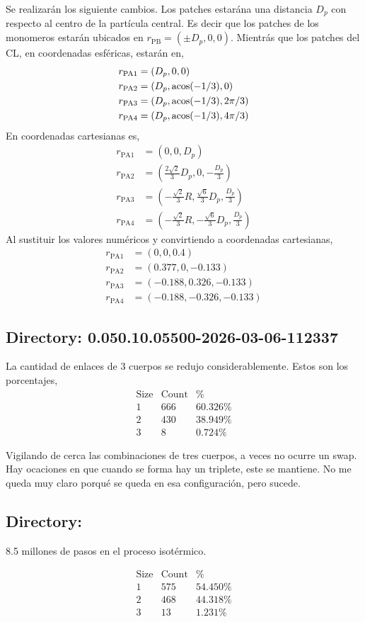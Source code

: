 \documentclass[../main.tex]{subfiles}
\begin{document}
Se realizarán los siguiente cambios.
Los patches estarána una distancia \(D_p\) con respecto al centro de la partícula central.
Es decir que los patches de los monomeros estarán ubicados en \(r_{\mathrm{PB}} = (\pm D_p, 0, 0)\).
Mientrás que los patches del CL, en coordenadas esféricas, estarán en,
\begin{align*}
    r_{\mathrm{PA}1} &= (D_p,0,0) \\
    r_{\mathrm{PA}2} &= (D_p,\acos(-1/3),0) \\
    r_{\mathrm{PA}3} &= (D_p,\acos(-1/3),2\pi/3) \\
    r_{\mathrm{PA}4} &= (D_p,\acos(-1/3),4\pi/3)
\end{align*}
En coordenadas cartesianas es,
\begin{align*}
    r_{\mathrm{PA}1} &= (0,0,D_p) \\
    r_{\mathrm{PA}2} &= (\frac{2\sqrt{2}}{3}D_p,0,-\frac{D_p}{3}) \\
    r_{\mathrm{PA}3} &= (-\frac{\sqrt{2}}{3}R,\frac{\sqrt{6}}{3}D_p,\frac{D_p}{3}) \\
    r_{\mathrm{PA}4} &= (-\frac{\sqrt{2}}{3}R,-\frac{\sqrt{6}}{3}D_p,\frac{D_p}{3})
\end{align*}
Al sustituir los valores numéricos y convirtiendo a coordenadas cartesianas,
\begin{align*}
    r_{\mathrm{PA}1} &= (0,0,0.4) \\
    r_{\mathrm{PA}2} &= (0.377,0,-0.133) \\
    r_{\mathrm{PA}3} &= (-0.188,0.326,-0.133) \\
    r_{\mathrm{PA}4} &= (-0.188,-0.326,-0.133)
\end{align*}



\subsection{Directory: 0.050.10.05500-2026-03-06-112337}

La cantidad de enlaces de 3 cuerpos se redujo considerablemente.
Estos son los porcentajes,
\begin{align*}
    \mathrm{Size} & \mathrm{Count} & \% \\
    1 & 666 & 60.326\% \\
    2 & 430 & 38.949\% \\
    3 & 8 & 0.724\%
\end{align*}

Vigilando de cerca las combinaciones de tres cuerpos, a veces no ocurre un swap.
Hay ocaciones en que cuando se forma hay un triplete, este se mantiene.
No me queda muy claro porqué se queda en esa configuración, pero sucede.

\newpage

\subsection{Directory: }

8.5 millones de pasos en el proceso isotérmico.

\begin{align*}
    \mathrm{Size} & \mathrm{Count} & \% \\
    1 & 575 & 54.450\% \\
    2 & 468 & 44.318\% \\
    3 & 13 & 1.231\%
\end{align*}
\end{document}
